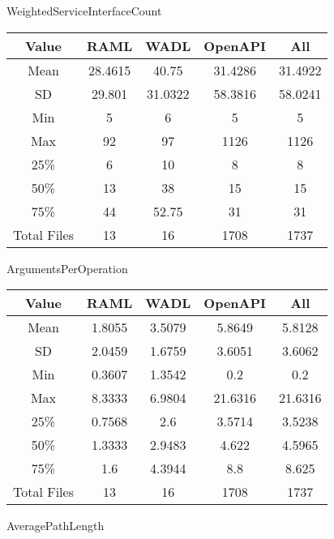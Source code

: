 

WeightedServiceInterfaceCount

\begin{center}
  \begin{tabular}{ c|c|c|c|c}
    \hline
     \label{table:WSIC}
     Value & RAML & WADL & OpenAPI & All \\ \hline
     Mean &28.4615 &40.75 &31.4286 &31.4922 \\ \hline
     SD &29.801&31.0322&58.3816&58.0241 \\ \hline
     Min &5&6&5&5 \\ \hline
     Max &92&97&1126&1126 \\ \hline
     \rowcolor[HTML]{00FF00} 25\% &6&10&8&8 \\ \hline
     \rowcolor[HTML]{7FFF00} 50\% &13&38&15&15 \\ \hline
     \rowcolor[HTML]{FFFF00} 75\% &44&52.75&31&31 \\ \hline
     Total Files &13&16&1708&1737 \\ \hline
  \end{tabular}
 \end{center}

ArgumentsPerOperation

\begin{center}
  \begin{tabular}{ c|c|c|c|c}
    \hline
     \label{table:WSIC}
     Value & RAML & WADL & OpenAPI & All \\ \hline
     Mean &1.8055 &3.5079 &5.8649 &5.8128 \\ \hline
     SD &2.0459&1.6759&3.6051&3.6062 \\ \hline
     Min &0.3607&1.3542&0.2&0.2 \\ \hline
     Max &8.3333&6.9804&21.6316&21.6316 \\ \hline
     \rowcolor[HTML]{00FF00} 25\% &0.7568&2.6&3.5714&3.5238 \\ \hline
     \rowcolor[HTML]{7FFF00} 50\% &1.3333&2.9483&4.622&4.5965 \\ \hline
     \rowcolor[HTML]{FFFF00} 75\% &1.6&4.3944&8.8&8.625 \\ \hline
     Total Files &13&16&1708&1737 \\ \hline
  \end{tabular}
 \end{center}

AveragePathLength

